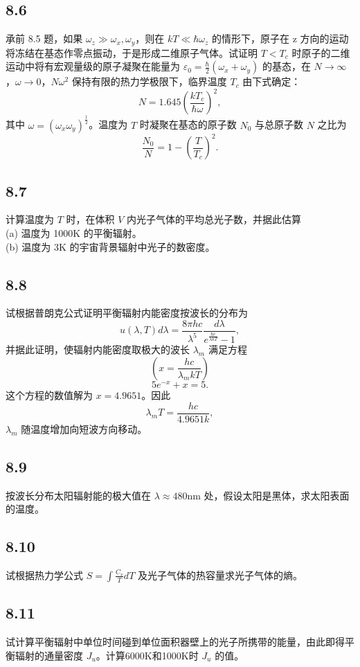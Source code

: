 \subsection{8.6}
承前 8.5 题，如果 $\omega_z \gg \omega_x, \omega_y$，则在 $kT \ll \hbar \omega_z$ 的情形下，原子在 z 方向的运动将冻结在基态作零点振动，于是形成二维原子气体。试证明 $T < T_c$ 时原子的二维运动中将有宏观量级的原子凝聚在能量为 $\varepsilon_0 = \frac{\hbar}{2} (\omega_x + \omega_y)$ 的基态，在 $N \to \infty$，$\omega \to 0$，$N \omega^2$ 保持有限的热力学极限下，临界温度 $T_c$ 由下式确定：
$$ N = 1.645 \left( \frac{kT_c}{\hbar \omega} \right)^2, $$
其中 $\omega = (\omega_x \omega_y )^{\frac{1}{2}}$。温度为 $T$ 时凝聚在基态的原子数 $N_0$ 与总原子数 $N$ 之比为
$$ \frac{N_0}{N} = 1 - \left( \frac{T}{T_c} \right)^2. $$

\newpage
\subsection{8.7}
计算温度为 $T$ 时，在体积 $V$ 内光子气体的平均总光子数，并据此估算\\
(a) 温度为 1000K 的平衡辐射。\\
(b) 温度为 3K 的宇宙背景辐射中光子的数密度。

\newpage
\subsection{8.8}
试根据普朗克公式证明平衡辐射内能密度按波长的分布为
$$ u(\lambda, T)d\lambda = \frac{8\pi hc}{\lambda^5} \frac{d\lambda}{e^{\frac{\hbar c}{\lambda kT}}-1}, $$
并据此证明，使辐射内能密度取极大的波长 $\lambda_m$ 满足方程
$$ \left( x = \frac{hc}{\lambda_m kT} \right) $$
$$ 5e^{-x} + x = 5. $$
这个方程的数值解为 $x = 4.9651$。因此
$$ \lambda_m T = \frac{hc}{4.9651k}, $$
$\lambda_m$ 随温度增加向短波方向移动。

\newpage
\subsection{8.9}
按波长分布太阳辐射能的极大值在 $\lambda \approx 480 \mathrm{nm}$ 处，假设太阳是黑体，求太阳表面的温度。

\newpage
\subsection{8.10}
试根据热力学公式 $S = \int \frac{C_v}{T} dT$ 及光子气体的热容量求光子气体的熵。

\newpage
\subsection{8.11}
试计算平衡辐射中单位时间碰到单位面积器壁上的光子所携带的能量，由此即得平衡辐射的通量密度 $J_u$。计算6000K和1000K时 $J_u$ 的值。

